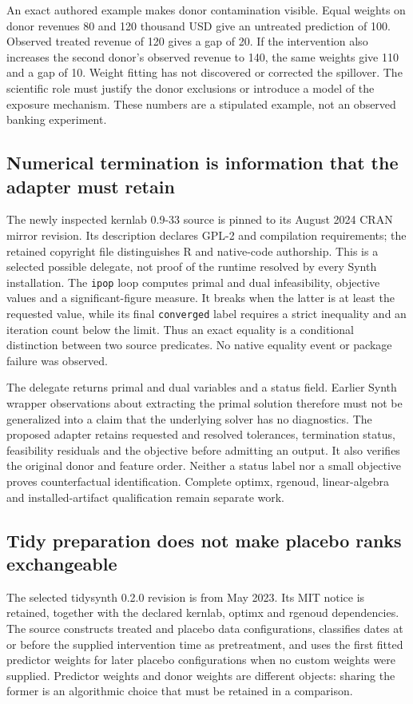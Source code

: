 An exact authored example makes donor contamination visible. Equal weights
on donor revenues 80 and 120 thousand USD give an untreated prediction of
100. Observed treated revenue of 120 gives a gap of 20. If the intervention
also increases the second donor's observed revenue to 140, the same weights
give 110 and a gap of 10. Weight fitting has not discovered or corrected the
spillover. The scientific role must justify the donor exclusions or introduce
a model of the exposure mechanism. These numbers are a stipulated example,
not an observed banking experiment.\citep{exec25_synthr_choice}

\subsection{Numerical termination is information that the adapter must retain}
The newly inspected kernlab 0.9-33 source is pinned to its August 2024 CRAN
mirror revision. Its description declares GPL-2 and compilation requirements;
the retained copyright file distinguishes R and native-code authorship. This
is a selected possible delegate, not proof of the runtime resolved by every
Synth installation. The \texttt{ipop} loop computes primal and dual
infeasibility, objective values and a significant-figure measure. It breaks
when the latter is at least the requested value, while its final
\texttt{converged} label requires a strict inequality and an iteration count
below the limit. Thus an exact equality is a conditional distinction between
two source predicates. No native equality event or package failure was
observed.\citep{exec25_synthr_kernlab}

The delegate returns primal and dual variables and a status field. Earlier
Synth wrapper observations about extracting the primal solution therefore
must not be generalized into a claim that the underlying solver has no
diagnostics. The proposed adapter retains requested and resolved tolerances,
termination status, feasibility residuals and the objective before admitting
an output. It also verifies the original donor and feature order. Neither a
status label nor a small objective proves counterfactual identification.
Complete optimx, rgenoud, linear-algebra and installed-artifact qualification
remain separate work.\citep{exec25_synthr_kernlab,exec24_synth_source,
exec25_synthr_choice}

\subsection{Tidy preparation does not make placebo ranks exchangeable}
The selected tidysynth 0.2.0 revision is from May 2023. Its MIT notice is
retained, together with the declared kernlab, optimx and rgenoud dependencies.
The source constructs treated and placebo data configurations, classifies
dates at or before the supplied intervention time as pretreatment, and uses
the first fitted predictor weights for later placebo configurations when no
custom weights were supplied. Predictor weights and donor weights are
different objects: sharing the former is an algorithmic choice that must
be retained in a comparison.\citep{exec25_synthr_tidysynth}

